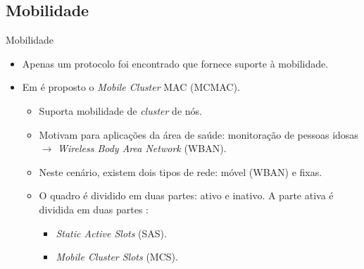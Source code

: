 \documentclass{beamer}
\begin{document}
\subsection{Mobilidade}
\begin{frame}{Mobilidade}
  \begin{itemize}
    \item Apenas um protocolo foi encontrado que fornece suporte à mobilidade.
    \item Em \cite{20103113115754} é proposto o \emph{Mobile Cluster} MAC (MCMAC).
    \begin{itemize}
      \item Suporta mobilidade de \emph{cluster} de nós.
      \item Motivam para aplicações da área de saúde: monitoração de pessoas idosas $\rightarrow$ \emph{Wireless Body Area Network} (WBAN).
      \item Neste cenário, existem dois tipos de rede: móvel (WBAN) e fixas.
      \item O quadro é dividido em duas partes: ativo e inativo. A parte ativa é dividida em duas partes \hyperlink{mcmac}{}:
	\hypertarget{mcmac_back}{}
	\begin{itemize}
	  \item \emph{Static Active Slots} (SAS).
	  \item \emph{Mobile Cluster Slots} (MCS).
	\end{itemize}
    \end{itemize}
  \end{itemize}
\end{frame}
\end{document}
